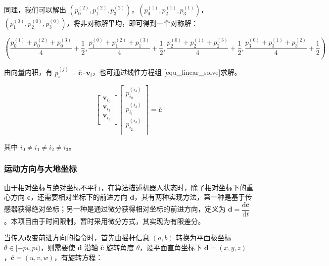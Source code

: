 \documentclass[a4paper]{ctexart}
\numberwithin{equation}{section}
\numberwithin{table}{section}
\numberwithin{figure}{section}
\begin{document}
同理，我们可以解出 $\left(p_0^{(2)},p_1^{(2)},p_3^{(2)}\right)$，$\left(p_0^{(1)},p_2^{(1)},p_3^{(1)}\right)$，$\left(p_1^{(0)},p_2^{(0)},p_3^{(0)}\right)$，将非对称解平均，即可得到一个对称解：

\begin{equation}
  \left(
    \frac{p_0^{(1)}+p_0^{(2)}+p_0^{(3)}}{4} +\frac{1}{2},
    \frac{p_1^{(0)}+p_1^{(2)}+p_1^{(3)}}{4} +\frac{1}{2},
    \frac{p_2^{(0)}+p_2^{(1)}+p_2^{(3)}}{4} +\frac{1}{2},
    \frac{p_3^{(0)}+p_3^{(1)}+p_3^{(2)}}{4} +\frac{1}{2}
  \right)
\end{equation}

由向量内积，有 $p_i^{(j)} = \overline{\boldsymbol c} \cdot \boldsymbol v_i$，也可通过线性方程组
\ref{equ_linear_solve}求解。

\begin{equation}
  \begin{bmatrix}
    \boldsymbol v_{i_0} \\
    \boldsymbol v_{i_1} \\
    \boldsymbol v_{i_2} \\
  \end{bmatrix}
  \begin{bmatrix}
    p_{i_0}^{(i_3)} \\
    p_{i_1}^{(i_3)} \\
    p_{i_2}^{(i_3)} \\
  \end{bmatrix}
  =
  \overline{\boldsymbol c}
  \label{equ_linear_solve}
\end{equation}

其中 $i_0\neq i_1\neq i_2\neq i_3$。


\subsubsection{运动方向与大地坐标}

由于相对坐标与绝对坐标不平行，在算法描述机器人状态时，除了相对坐标下的重心方向 $\overline{\boldsymbol c}$，还需要相对坐标下的前进方向 $\boldsymbol d$，其有两种实现方法，第一种是基于传感器获得绝对坐标；另一种是通过微分获得相对坐标的前进方向，定义为 $\boldsymbol d=\dfrac{\mathrm d\boldsymbol c}{\mathrm d t}$。本项目由于时间限制，暂时采用微分方式，其实现为有限差分。

当传入改变前进方向的指令时，首先由摇杆信息 $(a,b)$ 转换为平面极坐标 $\theta \in [-pi,pi)$，则需要使 $\boldsymbol d$ 沿轴 $\overline{\boldsymbol c}$ 旋转角度 $\theta$，设平面直角坐标下 $\boldsymbol d=(x,y,z)$，$\overline{\boldsymbol c}=(u,v,w)$，有旋转方程：
\end{document}
